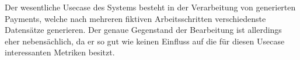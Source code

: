 Der wesentliche Usecase des Systems besteht in der Verarbeitung von generierten Payments, welche nach mehreren fiktiven Arbeitsschritten verschiedenste Datensätze generieren. Der genaue Gegenstand der Bearbeitung ist allerdings eher nebensächlich, da er so gut wie keinen Einfluss auf die für diesen Usecase interessanten Metriken besitzt. 
